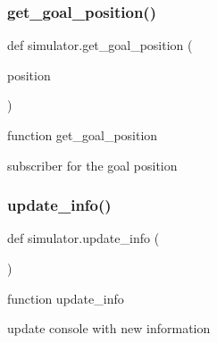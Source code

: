 \subsubsection{\texorpdfstring{get\+\_\+goal\+\_\+position()}{get\_goal\_position()}}
{\footnotesize\ttfamily def simulator.\+get\+\_\+goal\+\_\+position (\begin{DoxyParamCaption}\item[{}]{position }\end{DoxyParamCaption})}



function get\+\_\+goal\+\_\+position 

subscriber for the goal position \mbox{\label{namespacesimulator_a66bbb06efc0fb9abaefbfde72c8f0b85}} 
\subsubsection{\texorpdfstring{update\+\_\+info()}{update\_info()}}
{\footnotesize\ttfamily def simulator.\+update\+\_\+info (\begin{DoxyParamCaption}{ }\end{DoxyParamCaption})}



function update\+\_\+info 

update console with new information 
